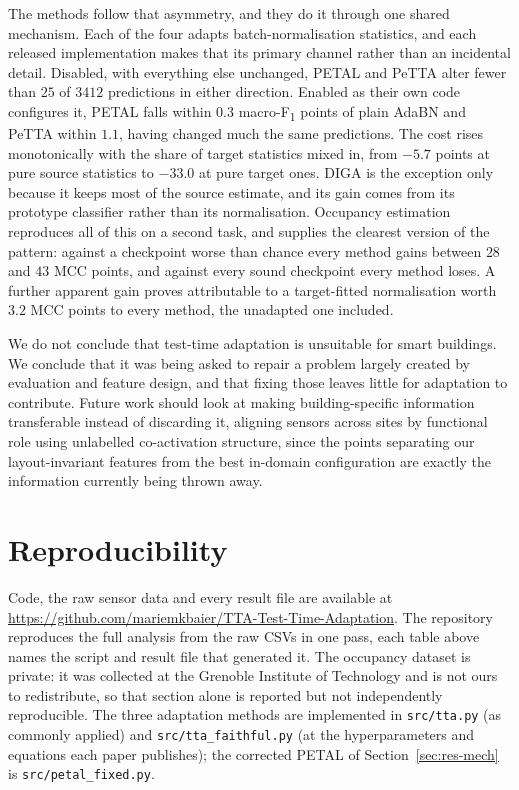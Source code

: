 \documentclass[a4paper,fleqn]{cas-dc}
\newcommand{\macf}{macro-F\textsubscript{1}}
\begin{document}
The methods follow that asymmetry, and they do it through one shared mechanism. Each of
the four adapts batch-normalisation statistics, and each released implementation makes
that its primary channel rather than an incidental detail. Disabled, with everything else
unchanged, PETAL and PeTTA alter fewer than $25$ of $3412$ predictions in either
direction. Enabled as their own code configures it, PETAL falls within $0.3$ \macf{}
points of plain AdaBN and PeTTA within $1.1$, having changed much the same predictions.
The cost rises monotonically with the share of target statistics mixed in, from $-5.7$
points at pure source statistics to $-33.0$ at pure target ones. DIGA is the exception
only because it keeps most of the source estimate, and its gain comes from its prototype
classifier rather than its normalisation. Occupancy estimation reproduces all of this on a
second task, and supplies the clearest version of the pattern: against a checkpoint worse
than chance every method gains between $28$ and $43$ MCC points, and against every sound
checkpoint every method loses. A further apparent gain proves attributable to a
target-fitted normalisation worth $3.2$ MCC points to every method, the unadapted one
included.

We do not conclude that test-time adaptation is unsuitable for smart buildings. We conclude
that it was being asked to repair a problem largely created by evaluation and feature
design, and that fixing those leaves little for adaptation to contribute. Future work
should look at making building-specific information transferable instead of discarding
it, aligning sensors across sites by functional role using unlabelled co-activation
structure, since the points separating our layout-invariant features from the
best in-domain configuration are exactly the information currently being thrown away.

\section*{Reproducibility}

Code, the raw sensor data and every result file are available at
\url{https://github.com/mariemkbaier/TTA-Test-Time-Adaptation}. The repository reproduces the
full analysis from the raw CSVs in one pass, each table above names the script and result
file that generated it. The occupancy dataset is private: it
was collected at the Grenoble Institute of Technology and is not ours to redistribute,
so that section alone is reported but not independently reproducible. The three adaptation
methods are implemented in \texttt{src/tta.py} (as commonly applied) and
\texttt{src/tta\_faithful.py} (at the hyperparameters and equations each paper publishes);
the corrected PETAL of Section~\ref{sec:res-mech} is \texttt{src/petal\_fixed.py}.
\end{document}
